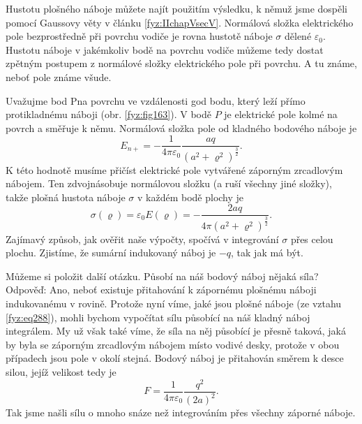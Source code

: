     Hustotu plošného náboje můžete najít použitím výsledku, k němuž jsme dospěli pomocí Gaussovy
    věty v článku \ref{fyz:IIchapVsecV}. Normálová složka elektrického pole bezprostředně při
    povrchu vodiče je rovna hustotě náboje \(\sigma\) dělené \(\varepsilon_0\). Hustotu náboje v
    jakémkoliv bodě na povrchu vodiče můžeme tedy dostat zpětným postupem z normálové složky
    elektrického pole při povrchu. A tu známe, neboť pole známe všude.
    
    Uvažujme bod Pna povrchu ve vzdálenosti god bodu, který leží přímo protikladnému náboji (obr.
    \ref{fyz:fig163}). V bodě \(P\) je elektrické pole kolmé na povrch a směřuje k němu. Normálová
    složka pole od kladného bodového náboje je
    \begin{equation}\label{fyz:eq287}
     E_{n+} = -\dfrac{1}{4\pi\varepsilon_0}\frac{aq}{(a^2+\varrho^2)^{\frac{3}{2}}}.
    \end{equation}
    K této hodnotě musíme přičíst elektrické pole vytvářené záporným zrcadlovým nábojem. Ten
    zdvojnásobuje normálovou složku (a ruší všechny jiné složky), takže plošná hustota náboje
    \(\sigma\) v každém bodě plochy je
    \begin{equation}\label{fyz:eq288}
     \sigma(\varrho) = \varepsilon_0E(\varrho) = -\frac{2aq}{4\pi(a^2+\varrho^2)^{\frac{3}{2}}}.
    \end{equation} 
    Zajímavý způsob, jak ověřit naše výpočty, spočívá v integrování \(\sigma\) přes celou 
    plochu. Zjistíme, že sumární indukovaný náboj je \(-q\), tak jak má být. 
    
    Můžeme si položit další otázku. Působí na náš bodový náboj nějaká síla? Odpověď: Ano, neboť
    existuje přitahování k zápornému plošnému náboji indukovanému v rovině. Protože nyní víme, jaké 
    jsou plošné náboje (ze vztahu \ref{fyz:eq288}), mohli bychom vypočítat sílu působící na náš 
    kladný náboj integrálem. My už však také víme, že síla na něj působící je přesně taková, jaká 
    by byla se záporným zrcadlovým nábojem místo vodivé desky, protože v obou případech jsou pole v 
    okolí stejná. Bodový náboj je přitahován směrem k desce silou, jejíž velikost tedy je
    \begin{equation}\label{fyz:eq289}
     F = \dfrac{1}{4\pi\varepsilon_0}\frac{q^2}{(2a)^2}.
    \end{equation} 
    Tak jsme našli sílu o mnoho snáze než integrováním přes všechny záporné náboje.
    
